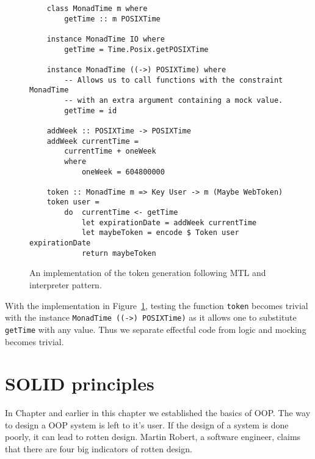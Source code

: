 \begin{figure}[H]
    \begin{lstlisting}
    class MonadTime m where
        getTime :: m POSIXTime

    instance MonadTime IO where
        getTime = Time.Posix.getPOSIXTime

    instance MonadTime ((->) POSIXTime) where
        -- Allows us to call functions with the constraint MonadTime
        -- with an extra argument containing a mock value.
        getTime = id

    addWeek :: POSIXTime -> POSIXTime
    addWeek currentTime =
        currentTime + oneWeek
        where
            oneWeek = 604800000

    token :: MonadTime m => Key User -> m (Maybe WebToken)
    token user =
        do  currentTime <- getTime
            let expirationDate = addWeek currentTime
            let maybeToken = encode $ Token user expirationDate
            return maybeToken
    \end{lstlisting}
    \caption{An implementation of the token generation following MTL and
    interpreter pattern.}
    \label{tokencorrect}
\end{figure}

With the implementation in Figure~\ref{tokencorrect}, testing the function
\texttt{token} becomes trivial with the instance \texttt{MonadTime ((->)
POSIXTime)} as it allows one to substitute \texttt{getTime} with any value. Thus
we separate effectful code from logic and mocking becomes trivial.


\section{SOLID principles}\label{oop}


In Chapter\label{introduction} and earlier in this chapter we established the
basics of OOP. The way to design a OOP system is left to it's user. If the
design of a system is done poorly, it can lead to rotten design. Martin Robert,
a software engineer, claims that there are four big indicators of rotten design.


